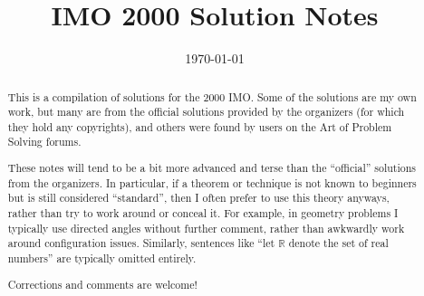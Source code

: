 \documentclass[11pt]{scrartcl}
\title{IMO 2000 Solution Notes}
\date{\today}
\begin{document}
\maketitle

\begin{abstract}
This is a compilation of solutions
for the 2000 IMO.
Some of the solutions are my own work,
but many are from the official solutions provided by the organizers
(for which they hold any copyrights),
and others were found by users on the Art of Problem Solving forums.

These notes will tend to be a bit more advanced and terse than the ``official''
solutions from the organizers.
In particular, if a theorem or technique is not known to beginners
but is still considered ``standard'', then I often prefer to
use this theory anyways, rather than try to work around or conceal it.
For example, in geometry problems I typically use directed angles
without further comment, rather than awkwardly work around configuration issues.
Similarly, sentences like ``let $\mathbb{R}$ denote the set of real numbers''
are typically omitted entirely.

Corrections and comments are welcome!
\end{abstract}

\tableofcontents
\newpage

\addtocounter{section}{-1}
\end{document}
